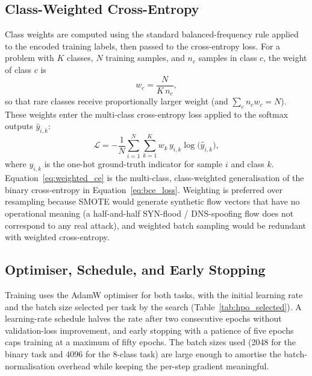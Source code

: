 \subsection{Class-Weighted Cross-Entropy}
\label{subsec:class_weighted_ce}

\par Class weights are computed using the standard balanced-frequency rule applied to the encoded training labels, then passed to the cross-entropy loss. For a problem with $K$ classes, $N$ training samples, and $n_c$ samples in class $c$, the weight of class $c$ is
\begin{equation}
    w_c = \frac{N}{K \, n_c},
    \label{eq:balanced_weights}
\end{equation}
so that rare classes receive proportionally larger weight (and $\sum_c n_c w_c = N$). These weights enter the multi-class cross-entropy loss applied to the softmax outputs $\hat{y}_{i,k}$:
\begin{equation}
    \mathcal{L} = -\frac{1}{N} \sum_{i=1}^{N} \sum_{k=1}^{K} w_{k}\, y_{i,k} \log\!\big(\hat{y}_{i,k}\big),
    \label{eq:weighted_ce}
\end{equation}
where $y_{i,k}$ is the one-hot ground-truth indicator for sample $i$ and class $k$. Equation~\eqref{eq:weighted_ce} is the multi-class, class-weighted generalisation of the binary cross-entropy in Equation~\eqref{eq:bce_loss}. Weighting is preferred over resampling because SMOTE would generate synthetic flow vectors that have no operational meaning (a half-and-half SYN-flood / DNS-spoofing flow does not correspond to any real attack), and weighted batch sampling would be redundant with weighted cross-entropy.

\subsection{Optimiser, Schedule, and Early Stopping}
\label{subsec:training_loop}

\par Training uses the AdamW optimiser for both tasks, with the initial learning rate and the batch size selected per task by the search (Table~\ref{tab:hpo_selected}). A learning-rate schedule halves the rate after two consecutive epochs without validation-loss improvement, and early stopping with a patience of five epochs caps training at a maximum of fifty epochs. The batch sizes used (2048 for the binary task and 4096 for the 8-class task) are large enough to amortise the batch-normalisation overhead while keeping the per-step gradient meaningful.

